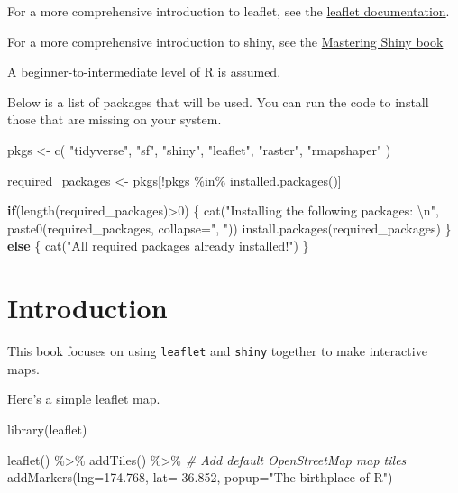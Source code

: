 \documentclass[
]{book}
\newenvironment{Shaded}{\begin{snugshade}}{\end{snugshade}}
\newcommand{\AttributeTok}[1]{\textcolor[rgb]{0.77,0.63,0.00}{#1}}
\newcommand{\CommentTok}[1]{\textcolor[rgb]{0.56,0.35,0.01}{\textit{#1}}}
\newcommand{\ControlFlowTok}[1]{\textcolor[rgb]{0.13,0.29,0.53}{\textbf{#1}}}
\newcommand{\DecValTok}[1]{\textcolor[rgb]{0.00,0.00,0.81}{#1}}
\newcommand{\FloatTok}[1]{\textcolor[rgb]{0.00,0.00,0.81}{#1}}
\newcommand{\FunctionTok}[1]{\textcolor[rgb]{0.00,0.00,0.00}{#1}}
\newcommand{\NormalTok}[1]{#1}
\newcommand{\OtherTok}[1]{\textcolor[rgb]{0.56,0.35,0.01}{#1}}
\newcommand{\SpecialCharTok}[1]{\textcolor[rgb]{0.00,0.00,0.00}{#1}}
\newcommand{\StringTok}[1]{\textcolor[rgb]{0.31,0.60,0.02}{#1}}
\begin{document}
For a more comprehensive introduction to leaflet, see the
\href{https://rstudio.github.io/leaflet/}{leaflet documentation}.

For a more comprehensive introduction to shiny, see the
\href{https://mastering-shiny.org/}{Mastering Shiny book}

A beginner-to-intermediate level of R is assumed.

Below is a list of packages that will be used. You can run the code to install those that are missing on your system.

\begin{Shaded}
\begin{Highlighting}[]
\NormalTok{pkgs }\OtherTok{\textless{}{-}} \FunctionTok{c}\NormalTok{(}
  \StringTok{"tidyverse"}\NormalTok{,}
  \StringTok{"sf"}\NormalTok{,}
  \StringTok{"shiny"}\NormalTok{,}
  \StringTok{"leaflet"}\NormalTok{,}
  \StringTok{"raster"}\NormalTok{,}
  \StringTok{"rmapshaper"}
\NormalTok{)}

\NormalTok{required\_packages }\OtherTok{\textless{}{-}}\NormalTok{ pkgs[}\SpecialCharTok{!}\NormalTok{pkgs }\SpecialCharTok{\%in\%} \FunctionTok{installed.packages}\NormalTok{()]}

\ControlFlowTok{if}\NormalTok{(}\FunctionTok{length}\NormalTok{(required\_packages)}\SpecialCharTok{\textgreater{}}\DecValTok{0}\NormalTok{) \{}
  \FunctionTok{cat}\NormalTok{(}\StringTok{"Installing the following packages: }\SpecialCharTok{\textbackslash{}n}\StringTok{"}\NormalTok{, }\FunctionTok{paste0}\NormalTok{(required\_packages, }\AttributeTok{collapse=}\StringTok{", "}\NormalTok{))}
  \FunctionTok{install.packages}\NormalTok{(required\_packages)}
\NormalTok{\} }\ControlFlowTok{else}\NormalTok{ \{}
  \FunctionTok{cat}\NormalTok{(}\StringTok{"All required packages already installed!"}\NormalTok{)}
\NormalTok{\}}
\end{Highlighting}
\end{Shaded}

\hypertarget{intro}{%
\chapter{Introduction}\label{intro}}

This book focuses on using \texttt{leaflet} and \texttt{shiny} together to make interactive maps.

Here's a simple leaflet map.

\begin{Shaded}
\begin{Highlighting}[]
\FunctionTok{library}\NormalTok{(leaflet)}

\FunctionTok{leaflet}\NormalTok{() }\SpecialCharTok{\%\textgreater{}\%}
  \FunctionTok{addTiles}\NormalTok{() }\SpecialCharTok{\%\textgreater{}\%}  \CommentTok{\# Add default OpenStreetMap map tiles}
  \FunctionTok{addMarkers}\NormalTok{(}\AttributeTok{lng=}\FloatTok{174.768}\NormalTok{, }\AttributeTok{lat=}\SpecialCharTok{{-}}\FloatTok{36.852}\NormalTok{, }\AttributeTok{popup=}\StringTok{"The birthplace of R"}\NormalTok{)}
\end{Highlighting}
\end{Shaded}
\end{document}
